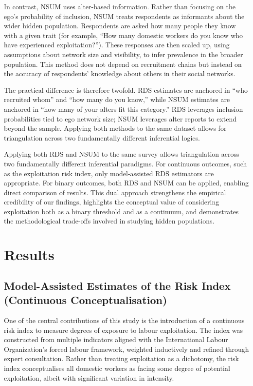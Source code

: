 \documentclass[
  12pt,
  letterpaper,
  DIV=11,
  numbers=noendperiod]{scrartcl}
\theoremstyle{plain}
\theoremstyle{definition}
\begin{document}
In contrast, NSUM uses alter-based information. Rather than focusing on
the ego's probability of inclusion, NSUM treats respondents as
informants about the wider hidden population. Respondents are asked how
many people they know with a given trait (for example, ``How many
domestic workers do you know who have experienced exploitation?'').
These responses are then scaled up, using assumptions about network size
and visibility, to infer prevalence in the broader population. This
method does not depend on recruitment chains but instead on the accuracy
of respondents' knowledge about others in their social networks.

The practical difference is therefore twofold. RDS estimates are
anchored in ``who recruited whom'' and ``how many do you know,'' while
NSUM estimates are anchored in ``how many of your alters fit this
category.'' RDS leverages inclusion probabilities tied to ego network
size; NSUM leverages alter reports to extend beyond the sample. Applying
both methods to the same dataset allows for triangulation across two
fundamentally different inferential logics.

Applying both RDS and NSUM to the same survey allows triangulation
across two fundamentally different inferential paradigms. For continuous
outcomes, such as the exploitation risk index, only model-assisted RDS
estimators are appropriate. For binary outcomes, both RDS and NSUM can
be applied, enabling direct comparison of results. This dual approach
strengthens the empirical credibility of our findings, highlights the
conceptual value of considering exploitation both as a binary threshold
and as a continuum, and demonstrates the methodological trade-offs
involved in studying hidden populations.

\section{Results}\label{results}

\subsection{Model-Assisted Estimates of the Risk Index (Continuous
Conceptualisation)}\label{model-assisted-estimates-of-the-risk-index-continuous-conceptualisation}

One of the central contributions of this study is the introduction of a
continuous risk index to measure degrees of exposure to labour
exploitation. The index was constructed from multiple indicators aligned
with the International Labour Organization's forced labour framework,
weighted inductively and refined through expert consultation. Rather
than treating exploitation as a dichotomy, the risk index conceptualises
all domestic workers as facing some degree of potential exploitation,
albeit with significant variation in intensity.
\end{document}
